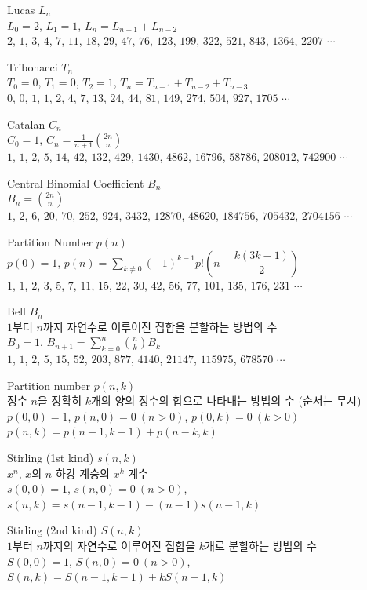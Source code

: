 \documentclass[a4paper,landscape,9pt,twocolumn]{article}
\begin{document}
Lucas $L_n$ \\
$L_0 = 2$, $L_1 = 1$, $L_n = L_{n-1} + L_{n-2}$ \\
$2$, $1$, $3$, $4$, $7$, $11$, $18$, $29$, $47$, $76$, $123$, $199$, $322$, $521$, $843$, $1364$, $2207$ $\cdots$
\newline

Tribonacci $T_n$ \\
$T_0 = 0$, $T_1 = 0$, $T_2 = 1$, $T_n = T_{n-1} + T_{n-2} + T_{n-3}$ \\
$0$, $0$, $1$, $1$, $2$, $4$, $7$, $13$, $24$, $44$, $81$, $149$, $274$, $504$, $927$, $1705$ $\cdots$
\newline

Catalan $C_n$ \\
$C_0 = 1$, $C_n = \frac{1}{n+1}\binom{2n}{n}$ \\
$1$, $1$, $2$, $5$, $14$, $42$, $132$, $429$, $1430$, $4862$, $16796$, $58786$, $208012$, $742900$ $\cdots$
\newline

Central Binomial Coefficient $B_n$ \\
$B_n = \binom{2n}{n}$ \\
$1$, $2$, $6$, $20$, $70$, $252$, $924$, $3432$, $12870$, $48620$, $184756$, $705432$, $2704156$ $\cdots$
\newline

Partition Number $p(n)$ \\
$p(0)=1$, $p(n)=\sum_{k\neq 0} (-1)^{k-1} p!\left(n-\dfrac{k(3k-1)}{2}\right)$ \\
$1$, $1$, $2$, $3$, $5$, $7$, $11$, $15$, $22$, $30$, $42$, $56$, $77$, $101$, $135$, $176$, $231$ $\cdots$
\newline

Bell $B_n$ \\
$1$부터 $n$까지 자연수로 이루어진 집합을 분할하는 방법의 수 \\
$B_0 = 1$, $B_{n+1} = \sum_{k=0}^{n} \binom{n}{k} B_k$ \\
$1$, $1$, $2$, $5$, $15$, $52$, $203$, $877$, $4140$, $21147$, $115975$, $678570$ $\cdots$
\newline

Partition number $p(n,k)$ \\
정수 $n$을 정확히 $k$개의 양의 정수의 합으로 나타내는 방법의 수 (순서는 무시) \\
$p(0,0)=1$, $p(n,0)=0\ (n>0)$, $p(0,k)=0\ (k>0)$ \\
$p(n,k)=p(n-1,k-1)+p(n-k,k)$ \\
\newline

Stirling (1st kind) $s(n, k)$ \\
$x^{\underline{n}}$, $x$의 $n$ 하강 계승의 $x^{k}$ 계수  \\
$s(0,0)=1$, $s(n,0)=0\ (n>0)$, $s(n,k)=s(n-1,k-1)-(n-1)s(n-1,k)$ \\
\newline

Stirling (2nd kind) $S(n,k)$ \\
$1$부터 $n$까지의 자연수로 이루어진 집합을 $k$개로 분할하는 방법의 수 \\
$S(0,0)=1$, $S(n,0)=0\ (n>0)$, $S(n,k)=S(n-1,k-1)+kS(n-1,k)$ \\
\newline
\end{document}
